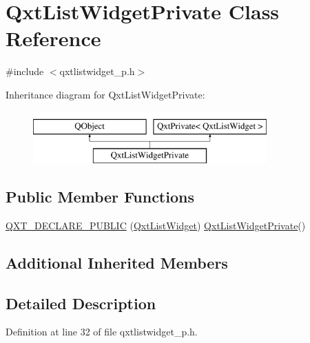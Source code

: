 \hypertarget{class_qxt_list_widget_private}{\section{Qxt\-List\-Widget\-Private Class Reference}
\label{class_qxt_list_widget_private}
}


{\ttfamily \#include $<$qxtlistwidget\-\_\-p.\-h$>$}

Inheritance diagram for Qxt\-List\-Widget\-Private\-:\begin{figure}[H]
\begin{center}
\leavevmode
\includegraphics[height=2.000000cm]{class_qxt_list_widget_private}
\end{center}
\end{figure}
\subsection*{Public Member Functions}
\begin{DoxyCompactItemize}
\item 
\hyperlink{class_qxt_list_widget_private_a1bcae993e1cf74f8a1a74bd4378fd836}{Q\-X\-T\-\_\-\-D\-E\-C\-L\-A\-R\-E\-\_\-\-P\-U\-B\-L\-I\-C} (\hyperlink{class_qxt_list_widget}{Qxt\-List\-Widget}) \hyperlink{class_qxt_list_widget_private}{Qxt\-List\-Widget\-Private}()
\end{DoxyCompactItemize}
\subsection*{Additional Inherited Members}


\subsection{Detailed Description}


Definition at line 32 of file qxtlistwidget\-\_\-p.\-h.



